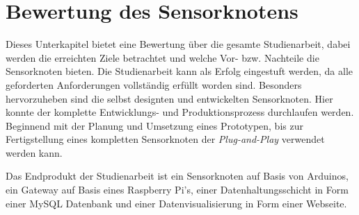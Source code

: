 \section{Bewertung des Sensorknotens}
Dieses Unterkapitel bietet eine Bewertung über die gesamte Studienarbeit, dabei werden die erreichten Ziele betrachtet und welche Vor- bzw. Nachteile die Sensorknoten bieten. 
Die Studienarbeit kann als Erfolg eingestuft werden, da alle geforderten Anforderungen vollständig erfüllt worden sind. Besonders hervorzuheben sind die selbst designten und entwickelten Sensorknoten. Hier konnte der komplette Entwicklungs- und Produktionsprozess durchlaufen werden. Beginnend mit der Planung und Umsetzung eines Prototypen, bis zur Fertigstellung eines kompletten Sensorknoten der \textit{Plug-and-Play} verwendet werden kann.

Das Endprodukt der Studienarbeit ist ein Sensorknoten auf Basis von Arduinos, ein Gateway auf Basis eines Raspberry Pi’s, einer Datenhaltungsschicht in Form einer MySQL Datenbank und einer Datenvisualisierung in Form einer Webseite.

